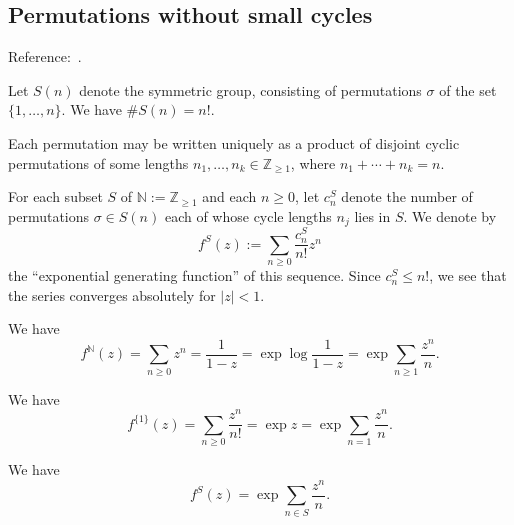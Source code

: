 \documentclass[reqno]{amsart}  \numberwithin{theorem}{section} \numberwithin{equation}{section}
\begin{document}
\subsection{Permutations without small cycles}
Reference:~\cite[p176]{MR2172781}.

Let $S(n)$ denote the symmetric group, consisting of permutations $\sigma$ of the set $ \{1, \dotsc, n\}$.  We have $\# S(n) = n!$.

Each permutation may be written uniquely as a product of disjoint cyclic permutations of some lengths $n_1, \dotsc, n_k \in \mathbb{Z}_{\geq 1}$, where $n_1 + \dotsb + n_k = n$.

For each subset $S$ of $\mathbb{N} := \mathbb{Z}_{\geq 1}$ and each $n \geq 0$, let $c_n^S$ denote the number of permutations $\sigma \in S(n)$ each of whose cycle lengths $n_j$ lies in $S$.  We denote by
\begin{equation*}
  f^S(z) := \sum_{n \geq 0} \frac{c_n^S}{n!} z^n
\end{equation*}
the ``exponential generating function'' of this sequence.  Since $c_n^S \leq n!$, we see that the series converges absolutely for $|z| < 1$.
\begin{example}
  We have
  \begin{equation*}
    f^{\mathbb{N} } (z) = \sum_{n \geq 0} z^n = \frac{1}{1-z}
    = \exp \log \frac{1}{1 - z}
    =
    \exp \sum _{n \geq 1} \frac{z^n}{n}.
  \end{equation*}
\end{example}
\begin{example}
  We have
  \begin{equation*}
    f^{\{1\}}(z) = \sum_{n \geq 0} \frac{z^n}{n!} = \exp z
    = \exp \sum_{n = 1} \frac{z^n }{n}.
  \end{equation*}
\end{example}
\begin{lemma}
  We have
  \begin{equation*}
    f^S(z) = \exp \sum_{n \in S} \frac{z^n}{n}.
  \end{equation*}
\end{lemma}
\end{document}
